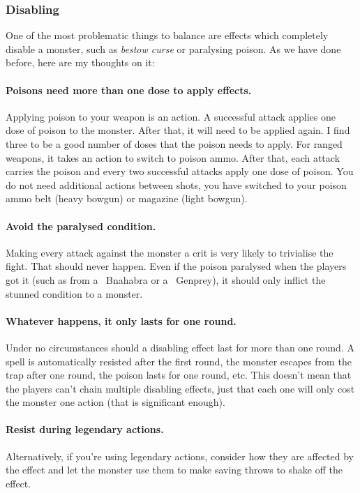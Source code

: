 \subsubsection{Disabling}
One of the most problematic things to balance are effects which completely disable a monster, such as \emph{bestow curse} or paralysing poison. As we have done before, here are my thoughts on it:
\paragraph{Poisons need more than one dose to apply effects.} Applying poison to your weapon is an action. A successful attack applies one dose of poison to the monster. After that, it will need to be applied again. I find three to be a good number of doses that the poison needs to apply. For ranged weapons, it takes an action to switch to poison ammo. After that, each attack carries the poison and every two successful attacks apply one dose of poison. You do not need additional actions between shots, you have switched to your poison ammo belt (heavy bowgun) or magazine (light bowgun).
\paragraph{Avoid the paralysed condition.} Making every attack against the monster a crit is very likely to trivialise the fight. That should never happen. Even if the poison paralysed when the players got it (such as from a ~Bnahabra or a ~Genprey), it should only inflict the stunned condition to a monster.
\paragraph{Whatever happens, it only lasts for one round.} Under no circumstances should a disabling effect last for more than one round. A spell is automatically resisted after the first round, the monster escapes from the trap after one round, the poison lasts for one round, etc. This doesn't mean that the players can't chain multiple disabling effects, just that each one will only cost the monster one action (that is significant enough).
\paragraph{Resist during legendary actions.} Alternatively, if you're using legendary actions, consider how they are affected by the effect and let the monster use them to make saving throws to shake off the effect.

